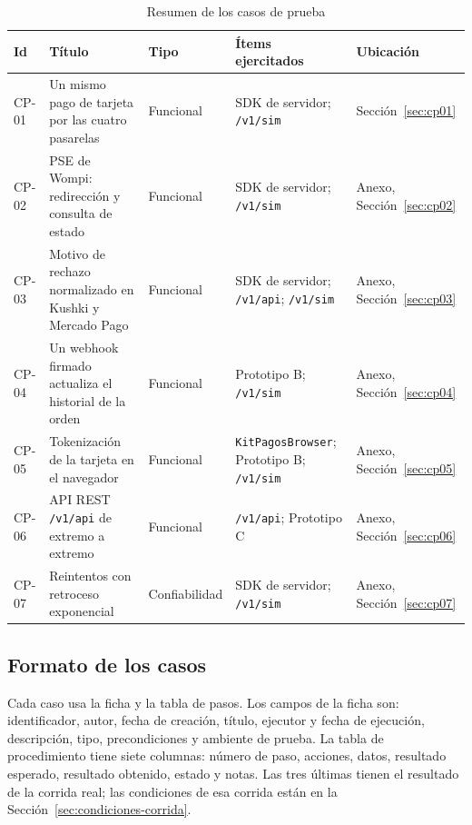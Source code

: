 \begin{table}[H]
  \centering
  \small
  \renewcommand{\arraystretch}{1.25}
  \setlength{\tabcolsep}{3pt}
  \begin{tabularx}{\textwidth}{|>{\raggedright\arraybackslash}p{1.15cm}|>{\raggedright\arraybackslash}X|>{\raggedright\arraybackslash}p{2.1cm}|>{\raggedright\arraybackslash}p{3.6cm}|>{\raggedright\arraybackslash}p{2.1cm}|}
    \hline
    \textbf{Id} & \textbf{Título} & \textbf{Tipo} & \textbf{Ítems ejercitados} & \textbf{Ubicación} \\ \hline
    CP-01 & Un mismo pago de tarjeta por las cuatro pasarelas & Funcional & SDK de servidor; \texttt{/v1/sim} & Sección~\ref{sec:cp01} \\ \hline
    CP-02 & PSE de Wompi: redirección y consulta de estado & Funcional & SDK de servidor; \texttt{/v1/sim} & Anexo, Sección~\ref{sec:cp02} \\ \hline
    CP-03 & Motivo de rechazo normalizado en Kushki y Mercado Pago & Funcional & SDK de servidor; \texttt{/v1/api}; \texttt{/v1/sim} & Anexo, Sección~\ref{sec:cp03} \\ \hline
    CP-04 & Un webhook firmado actualiza el historial de la orden & Funcional & Prototipo B; \texttt{/v1/sim} & Anexo, Sección~\ref{sec:cp04} \\ \hline
    CP-05 & Tokenización de la tarjeta en el navegador & Funcional & \texttt{KitPagosBrowser}; Prototipo B; \texttt{/v1/sim} & Anexo, Sección~\ref{sec:cp05} \\ \hline
    CP-06 & API REST \texttt{/v1/api} de extremo a extremo & Funcional & \texttt{/v1/api}; Prototipo C & Anexo, Sección~\ref{sec:cp06} \\ \hline
    CP-07 & Reintentos con retroceso exponencial & Confiabilidad & SDK de servidor; \texttt{/v1/sim} & Anexo, Sección~\ref{sec:cp07} \\ \hline
  \end{tabularx}
  \caption{Resumen de los casos de prueba}
  \label{tab:resumen-casos}
\end{table}

\subsection{Formato de los casos}

Cada caso usa la ficha y la tabla de pasos. Los campos de la ficha son: identificador, autor, fecha de creación, título, ejecutor y fecha de ejecución, descripción, tipo, precondiciones y ambiente de prueba. La tabla de procedimiento tiene siete columnas: número de paso, acciones, datos, resultado esperado, resultado obtenido, estado y notas. Las tres últimas tienen el resultado de la corrida real; las condiciones de esa corrida están en la Sección~\ref{sec:condiciones-corrida}.


